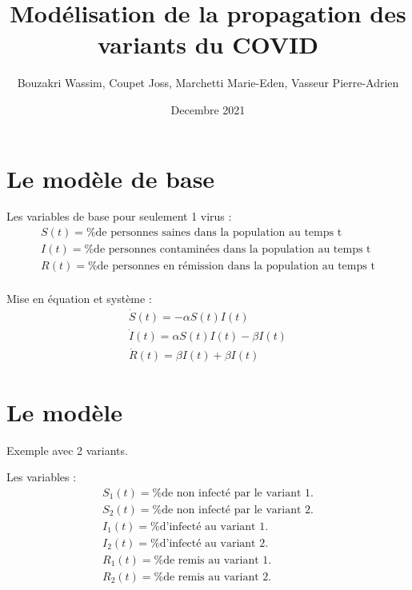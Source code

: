 \documentclass{article}
\title{Modélisation de la propagation des variants du COVID}
\author{Bouzakri Wassim, Coupet Joss, Marchetti Marie-Eden, Vasseur Pierre-Adrien}
\date{Decembre 2021}
\begin{document}
\maketitle

\section{Le modèle de base}

Les variables de base pour seulement 1 virus : 
\begin{align}
    S(t)= \text{\% de personnes saines dans la population au temps t} \\
    I(t)= \text{\% de personnes contaminées dans la population au temps t} \\
    R(t)= \text{\% de personnes en rémission dans la population au temps t} \\
\end{align}

Mise en équation et système : 
\begin{align}
    \dot{S}(t)= -\alpha S(t)I(t) \\
    \dot{I}(t)= \alpha S(t)I(t)-\beta I(t) \\
    \dot{R}(t)= \beta I(t) + \beta I(t)
\end{align}

\section{Le modèle}

Exemple avec 2 variants.

Les variables : 
\begin{align}
    S_1(t)= \text{\% de non infecté par le variant 1.} \\
    S_2(t)= \text{\% de non infecté par le variant 2.} \\
    I_1(t)= \text{\% d'infecté au variant 1.} \\
    I_2(t)= \text{\% d'infecté au variant 2.} \\
    R_1(t)= \text{\% de remis au variant 1.} \\
    R_2(t)= \text{\% de remis au variant 2.} \\
\end{align}
\end{document}
